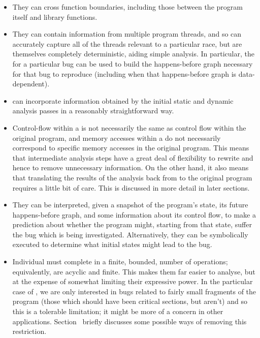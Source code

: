 \begin{itemize}
\item
  They can cross function boundaries, including those between the
  program itself and library functions.
\item
  They can contain information from multiple program threads, and so
  can accurately capture all of the threads relevant to a particular
  race, but are themselves completely deterministic, aiding simple
  analysis.  In particular, the \StateMachine for a particular bug can
  be used to build the happens-before graph necessary for that bug to
  reproduce (including when that happens-before graph is
  data-dependent).
\item
  \STateMachines can incorporate information obtained by the initial
  static and dynamic analysis passes in a reasonably straightforward
  way.
\item
  Control-flow within a \StateMachine is not necessarily the same as
  control flow within the original program, and memory accesses within
  a \StateMachine do not necessarily correspond to specific memory
  accesses in the original program.  This means that intermediate
  analysis steps have a great deal of flexibility to rewrite
  \StateMachines and hence to remove unnecessary information.  On the
  other hand, it also means that translating the results of the
  analysis back from \StateMachines to the original program requires a
  little bit of care.  This is discussed in more detail in later
  sections.
\item
  They can be interpreted, given a snapshot of the program's state,
  its future happens-before graph, and some information about its
  control flow, to make a prediction about whether the program might,
  starting from that state, suffer the bug which is being
  investigated.  Alternatively, they can be symbolically executed to
  determine what initial states might lead to the bug.

\item
  Individual \StateMachines must complete in a finite, bounded, number
  of operations; equivalently, \StateMachines are acyclic and finite.
  This makes them far easier to analyse, but at the expense of
  somewhat limiting their expressive power.  In the particular case of
  \technique{}, we are only interested in bugs related to fairly small
  fragments of the program (those which should have been critical
  sections, but aren't) and so this is a tolerable limitation; it
  might be more of a concern in other applications.
  Section~ briefly discusses some possible ways of removing
  this restriction.
\end{itemize}

